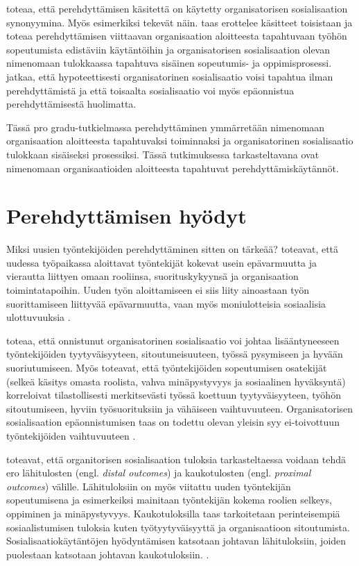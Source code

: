 \documentclass[utf8]{gradu3}
\begin{document}
\textcite{chao-2012} toteaa, että perehdyttämisen käsitettä on käytetty organisatorisen sosialisaation synonyymina. Myös esimerkiksi \textcite{bauer-ym-2007} tekevät näin. \textcite{wanberg-2012} taas erottelee käsitteet toisistaan ja toteaa perehdyttämisen viittaavan organisaation aloitteesta tapahtuvaan työhön sopeutumista edistäviin käytäntöihin ja organisatorisen sosialisaation olevan nimenomaan tulokkaassa tapahtuva sisäinen sopeutumis- ja oppimisprosessi. \textcite{wanberg-2012} jatkaa, että hypoteettisesti organisatorinen sosialisaatio voisi tapahtua ilman perehdyttämistä ja että toisaalta sosialisaatio voi myös epäonnistua perehdyttämisestä huolimatta.

Tässä pro gradu-tutkielmassa perehdyttäminen ymmärretään nimenomaan organisaation aloitteesta tapahtuvaksi toiminnaksi ja organisatorinen sosialisaatio tulokkaan sisäiseksi prosessiksi. Tässä tutkimuksessa tarkasteltavana ovat nimenomaan organisaatioiden aloitteesta tapahtuvat perehdyttämiskäytännöt.


\section{Perehdyttämisen hyödyt}
\label{luku-perehdyttämisen-hyödyt}

Miksi uusien työntekijöiden perehdyttäminen sitten on tärkeää? \textcite{saks-gruman-2012} toteavat, että uudessa työpaikassa aloittavat työntekijät kokevat usein epävarmuutta ja vierautta liittyen omaan rooliinsa, suorituskykyynsä ja organisaation toimintatapoihin. Uuden työn aloittamiseen ei siis liity ainoastaan työn  suorittamiseen liittyvää epävarmuutta, vaan myös moniulotteisia sosiaalisia ulottuvuuksia \parencite{saks-gruman-2012}. 

\textcite{wanberg-2012} toteaa, että onnistunut organisatorinen sosialisaatio voi johtaa lisääntyneeseen työntekijöiden tyytyväisyyteen, sitoutuneisuuteen, työssä pysymiseen ja hyvään suoriutumiseen. Myös \textcite{bauer-ym-2007} toteavat, että työntekijöiden sopeutumisen osatekijät (selkeä käsitys omasta roolista, vahva minäpystyvyys ja sosiaalinen hyväksyntä) korreloivat tilastollisesti merkitsevästi työssä koettuun tyytyväisyyteen, työhön sitoutumiseen, hyviin työsuorituksiin ja vähäiseen vaihtuvuuteen. Organisatorisen sosialisaation epäonnistumisen taas on todettu olevan yleisin syy ei-toivottuun työntekijöiden vaihtuvuuteen \parencite{bauer-ym-1998}.

\textcite{saks-gruman-2012} toteavat, että organitorisen sosialisaation tuloksia tarkasteltaessa voidaan tehdä ero lähitulosten (engl. \textit{distal outcomes}) ja kaukotulosten (engl. \textit{proximal outcomes}) välille. Lähituloksiin on myös viitattu uuden työntekijän sopeutumisena ja esimerkeiksi mainitaan työntekijän kokema roolien selkeys, oppiminen ja minäpystyvyys. Kaukotuloksilla taas tarkoitetaan perinteisempiä sosiaalistumisen tuloksia kuten työtyytyväisyyttä ja organisaatioon sitoutumista. Sosialisaatiokäytäntöjen hyödyntämisen katsotaan johtavan lähituloksiin, joiden puolestaan katsotaan johtavan kaukotuloksiin. \parencite{saks-gruman-2012}.
\end{document}
